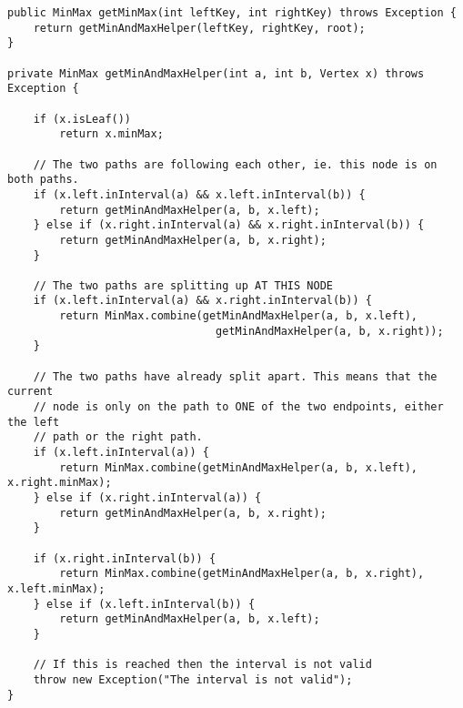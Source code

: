 \begin{lstlisting}
public MinMax getMinMax(int leftKey, int rightKey) throws Exception {
    return getMinAndMaxHelper(leftKey, rightKey, root);
}

private MinMax getMinAndMaxHelper(int a, int b, Vertex x) throws Exception {

    if (x.isLeaf())
        return x.minMax;

    // The two paths are following each other, ie. this node is on both paths.
    if (x.left.inInterval(a) && x.left.inInterval(b)) {
        return getMinAndMaxHelper(a, b, x.left);
    } else if (x.right.inInterval(a) && x.right.inInterval(b)) {
        return getMinAndMaxHelper(a, b, x.right);
    }

    // The two paths are splitting up AT THIS NODE
    if (x.left.inInterval(a) && x.right.inInterval(b)) {
        return MinMax.combine(getMinAndMaxHelper(a, b, x.left),
                                getMinAndMaxHelper(a, b, x.right));
    }

    // The two paths have already split apart. This means that the current
    // node is only on the path to ONE of the two endpoints, either the left
    // path or the right path.
    if (x.left.inInterval(a)) {
        return MinMax.combine(getMinAndMaxHelper(a, b, x.left), x.right.minMax);
    } else if (x.right.inInterval(a)) {
        return getMinAndMaxHelper(a, b, x.right);
    }

    if (x.right.inInterval(b)) {
        return MinMax.combine(getMinAndMaxHelper(a, b, x.right), x.left.minMax);
    } else if (x.left.inInterval(b)) {
        return getMinAndMaxHelper(a, b, x.left);
    }

    // If this is reached then the interval is not valid
    throw new Exception("The interval is not valid");
}
\end{lstlisting}